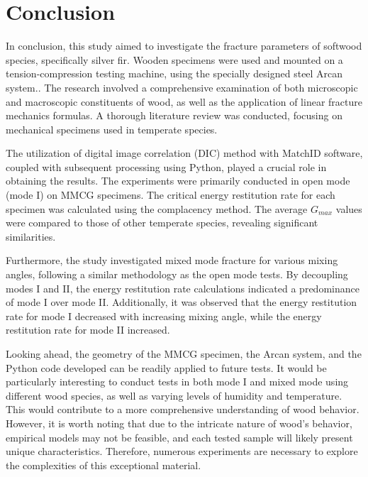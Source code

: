 
\chapter{Conclusion} %

\label{Conclusion} %


In conclusion, this study aimed to investigate the fracture parameters of softwood species, specifically silver fir. Wooden specimens were used and mounted on a tension-compression testing machine, using the specially designed steel Arcan system.. The research involved a comprehensive examination of both microscopic and macroscopic constituents of wood, as well as the application of linear fracture mechanics formulas. A thorough literature review was conducted, focusing on mechanical specimens used in temperate species.

The utilization of digital image correlation (DIC) method with MatchID software, coupled with subsequent processing using Python, played a crucial role in obtaining the results. The experiments were primarily conducted in open mode (mode I) on MMCG specimens. The critical energy restitution rate for each specimen was calculated using the complacency method. The average $G_{max}$ values were compared to those of other temperate species, revealing significant similarities.

Furthermore, the study investigated mixed mode fracture for various mixing angles, following a similar methodology as the open mode tests. By decoupling modes I and II, the energy restitution rate calculations indicated a predominance of mode I over mode II. Additionally, it was observed that the energy restitution rate for mode I decreased with increasing mixing angle, while the energy restitution rate for mode II increased.

Looking ahead, the geometry of the MMCG specimen, the Arcan system, and the Python code developed can be readily applied to future tests. It would be particularly interesting to conduct tests in both mode I and mixed mode using different wood species, as well as varying levels of humidity and temperature. This would contribute to a more comprehensive understanding of wood behavior. However, it is worth noting that due to the intricate nature of wood's behavior, empirical models may not be feasible, and each tested sample will likely present unique characteristics. Therefore, numerous experiments are necessary to explore the complexities of this exceptional material.